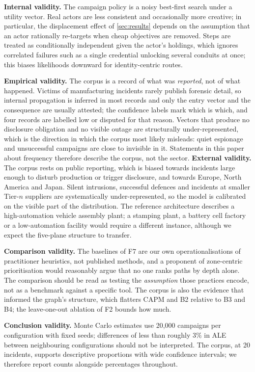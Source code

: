 \textbf{Internal validity.} The campaign policy is a noisy best-first search
under a utility vector. Real actors are less consistent and occasionally more
creative; in particular, the displacement effect of \cref{sec:results} depends
on the assumption that an actor rationally re-targets when cheap objectives are
removed. Steps are treated as conditionally independent given the actor's
holdings, which ignores correlated failures such as a single credential
unlocking several conduits at once; this biases likelihoods downward for
identity-centric routes.

\textbf{Empirical validity.} The corpus is a record of what was
\emph{reported}, not of what happened. Victims of manufacturing incidents
rarely publish forensic detail, so internal propagation is inferred in most
records and only the entry vector and the consequence are usually attested;
the confidence labels mark which is which, and four records are labelled low
or disputed for that reason. Vectors that produce no disclosure obligation and
no visible outage are structurally under-represented, which is the direction
in which the corpus most likely misleads: quiet espionage and unsuccessful
campaigns are close to invisible in it. Statements in this paper about
frequency therefore describe the corpus, not the sector.  \textbf{External
validity.} The corpus rests on public reporting, which is
biased towards incidents large enough to disturb production or trigger
disclosure, and towards Europe, North America and Japan. Silent intrusions,
successful defences and incidents at smaller Tier-$n$ suppliers are
systematically under-represented, so the model is calibrated on the visible
part of the distribution. The reference architecture describes a
high-automation vehicle assembly plant; a stamping plant, a battery cell
factory or a low-automation facility would require a different instance,
although we expect the five-plane structure to transfer.

\textbf{Comparison validity.} The baselines of F7 are our own operationalisations
of practitioner heuristics, not published methods, and a proponent of
zone-centric prioritisation would reasonably argue that no one ranks paths by
depth alone. The comparison should be read as testing the \emph{assumption}
those practices encode, not as a benchmark against a specific tool. The corpus
is also the evidence that informed the graph's structure, which flatters CAPM
and B2 relative to B3 and B4; the leave-one-out ablation of F2 bounds how much.

\textbf{Conclusion validity.} Monte Carlo estimates use 20,000 campaigns per
configuration with fixed seeds; differences of less than roughly 3\% in ALE
between neighbouring configurations should not be interpreted. The corpus, at
20 incidents, supports descriptive proportions with wide confidence intervals;
we therefore report counts alongside percentages throughout.

